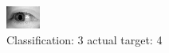 \begin{figure}[h!]
\begin{center}
\includegraphics[width=0.60\columnwidth]{figures/ID3155_class_3_target_4.png}
\end{center}
\caption{ Classification: 3 actual target: 4}
\label{fig:ID3155_class_3_target_4}
\end{figure}
